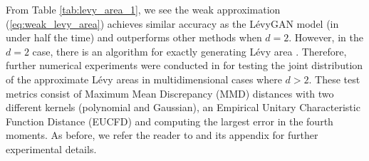 \documentclass[sn-mathphys-num]{sn-jnl}%
\begin{document}
From Table \ref{tab:levy_area_1}, we see the weak approximation (\ref{eq:weak_levy_area}) achieves similar accuracy as the L\'{e}vyGAN model (in under half the time) and outperforms other methods when $d=2$. However, in the $d=2$ case, there is an algorithm for exactly generating L\'{e}vy area \cite{gaines1994area}. Therefore, further numerical experiments were conducted in \cite{jelincic2025levygan} for testing the joint distribution of the approximate L\'{e}vy areas in multidimensional cases where $d > 2$. 
These test metrics consist of Maximum Mean Discrepancy (MMD) distances with two different kernels (polynomial and Gaussian), an Empirical Unitary Characteristic Function Distance (EUCFD) and computing the largest error in the fourth moments. As before, we refer the reader to \cite{jelincic2025levygan} and its appendix for further experimental details.\smallbreak
\end{document}
